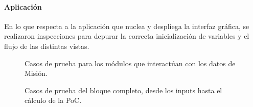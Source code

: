 \paragraph{Aplicaci\'on}
En lo que respecta a la aplicaci\'on que nuclea y despliega la interfaz gr\'afica, se realizaron inspecciones para depurar la correcta inicializaci\'on de variables y el flujo de las distintas vistas. 


\begin{figure}[!h]
\begin{minipage}[t]{0.48\textwidth}
 \centering
 \caption[Casos de Prueba I]{Casos de prueba para los módulos que interactúan con los datos de Misión.}
 \label{fig:pruebaCods}
\end{minipage}
\begin{minipage}[t]{0.48\textwidth}
 \centering
 \caption[Casos de Prueba II]{Casos de prueba del bloque completo, desde los inputs hasta el cálculo de la PoC.}
 \label{fig:pruebaEncuentro}
\end{minipage}
\end{figure}

